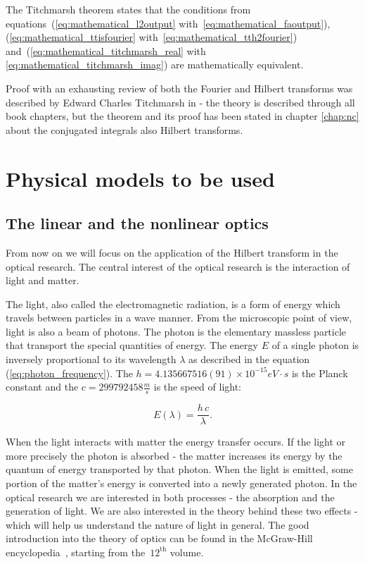 \documentclass[12pt,twoside,a4paper]{article}
\numberwithin{equation}{subsection}
\numberwithin{figure}{subsection}
\begin{document}
The Titchmarsh theorem states that the conditions from equations~(\ref{eq:mathematical_l2output} with~\ref{eq:mathematical_faoutput}),
(\ref{eq:mathematical_ttisfourier} with~\ref{eq:mathematical_tth2fourier}) and~(\ref{eq:mathematical_titchmarsh_real} with
\ref{eq:mathematical_titchmarsh_imag}) are mathematically equivalent.

Proof with an exhausting review of both the Fourier and Hilbert transforms was described by Edward Charles Titchmarsh in
\cite{titchmarsh_introduction} - the theory is described through all book chapters, but the theorem and its proof has been stated in chapter
\ref{chap:nc} about the conjugated integrals also Hilbert transforms.


\section{Physical models to be used} \label{chap:physical_models}

\subsection{The linear and the nonlinear optics} \label{chap:physical_linearnonlinear}

From now on we will focus on the application of the Hilbert transform in the optical research. The central interest of the optical research
is the interaction of light and matter. 

The light, also called the electromagnetic radiation, is a form of energy which travels between particles in a wave manner. From the
microscopic point of view, light is also a beam of photons. The photon is the elementary massless particle that transport the special
quantities of energy. The energy $E$ of a single photon is inversely proportional to its wavelength $\lambda$ as described in the equation
(\ref{eq:photon_frequency}). The $h = 4.135667516(91) \times 10^{-15} eV \cdot s$ is the Planck constant and the $c = 299792458 \frac{m}{s}$
is the speed of light:

\begin{equation} \label{eq:photon_frequency}
	E(\lambda) = \frac {h\,c} {\lambda}.
\end{equation}

When the light interacts with matter the energy transfer occurs. If the light or more precisely the photon is absorbed - the matter
increases its energy by the quantum of energy transported by that photon. When the light is emitted, some portion of the matter's energy is
converted into a newly generated photon. In the optical research we are interested in both processes - the absorption and the generation of
light. We are also interested in the theory behind these two effects - which will help us understand the nature of light in general. The
good introduction into the theory of optics can be found in the McGraw-Hill encyclopedia~\cite{mcgraw_encyclopedia}, starting from the~$
12^{\text{th}} $ volume.
\end{document}
